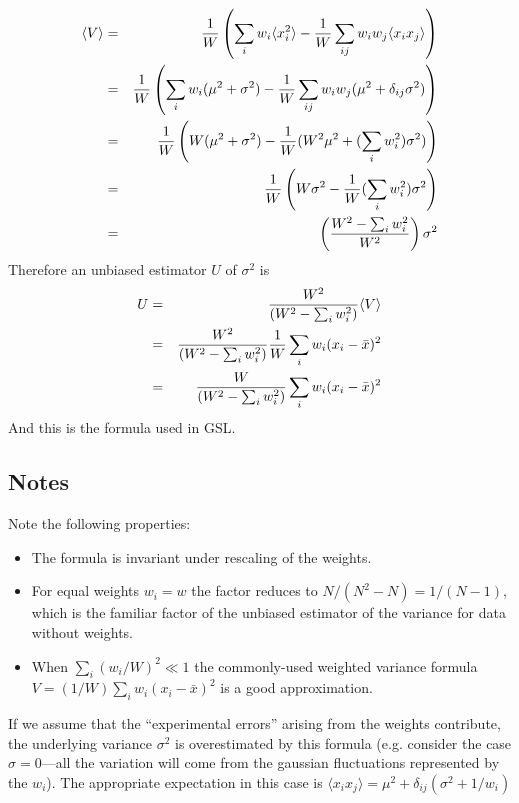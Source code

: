 \documentclass[fleqn,12pt]{article}
\newcommand{\expectation}[1]{\langle #1 \rangle}
\begin{document}
%
\begin{eqnarray}
\expectation{V}   &=& {1\over W} \left( \sum_i w_i \expectation{x_i^2}
       - {1 \over W} \sum_{ij} w_i w_j \expectation{x_i x_j}\right)\\
      &=& {1\over W} \left( \sum_i w_i (\mu^2 + \sigma^2)
       - {1 \over W} \sum_{ij} w_i w_j (\mu^2 + \delta_{ij} \sigma^2)\right)\\
      &=& {1\over W} \left( W (\mu^2 + \sigma^2)
       - {1 \over W} ( W^2 \mu^2 +( \sum_i w_i^2) \sigma^2)\right)\\
      &=& {1\over W} \left(W \sigma^2 - {1 \over W} ( \sum_i w_i^2)\sigma^2\right)\\
      &=& \left({{W^2 - \sum_i w_i^2} \over W^2}\right) \sigma^2
\end{eqnarray}
%
Therefore an unbiased estimator $U$ of $\sigma^2$ is
%
\begin{eqnarray}
U &=& {W^2 \over {(W^2 - \sum_i w_i^2)}} \expectation{V}\\
  &=& {W^2 \over {(W^2 - \sum_i w_i^2)}} {1\over W} \sum_i w_i (x_i - \bar{x})^2 \\
  &=& {W \over {(W^2 - \sum_i w_i^2)}} \sum_i w_i (x_i - \bar{x})^2
\end{eqnarray}
%
And this is the formula used in GSL.
\subsection{Notes}
Note the following properties:

\begin{itemize}
\item
The formula is invariant under rescaling of the weights.

\item 
For equal weights $w_i = w$ the factor reduces to $N/(N^2-N) =
1/(N-1)$, which is the familiar factor of the unbiased estimator of
the variance for data without weights.

\item
When $\sum_i (w_i/W)^2 \ll 1$ the commonly-used weighted variance
formula $V = (1/W)\sum_i w_i (x_i - \bar{x})^2$ is a good
approximation.
\end{itemize}

If we assume that the ``experimental errors'' arising from the weights
contribute, the underlying variance $\sigma^2$ is overestimated by
this formula (e.g. consider the case $\sigma = 0$---all the variation
will come from the gaussian fluctuations represented by the
$w_i$). The appropriate expectation in this case is $\expectation{x_i
  x_j} = \mu^2 + \delta_{ij} (\sigma^2 + 1/w_i)$
\end{document}
